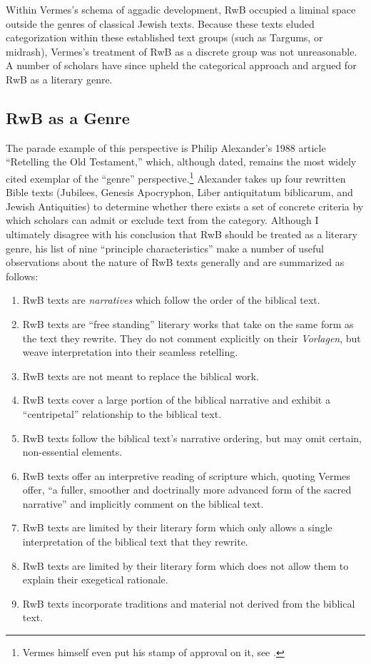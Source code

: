 Within Vermes's schema of aggadic development, RwB occupied a liminal
space outside the genres of classical Jewish texts. Because these texts
eluded categorization within these established text groups (such as
Targums, or midrash), Vermes's treatment of RwB as a discrete group was
not unreasonable. A number of scholars have since upheld the categorical
approach and argued for RwB as a literary genre.

\subsection{RwB as a Genre}\label{rwb-as-a-genre}

The parade example of this perspective is Philip Alexander's 1988
article ``Retelling the Old Testament,'' which, although dated, remains
the most widely cited exemplar of the ``genre'' perspective.\footnote{\textcite{alexander_carson-williamson1988}
  Vermes himself even put his stamp of approval on it, see
  \textcite[4]{vermes_zsengeller2014}.} Alexander takes up four
rewritten Bible texts (Jubilees, Genesis Apocryphon,
Liber antiquitatum biblicarum, and Jewish Antiquities) to determine
whether there exists a set of concrete criteria by which scholars can
admit or exclude text from the category. Although I ultimately disagree
with his conclusion that RwB should be treated as a literary genre, his
list of nine ``principle characteristics'' make a number of useful
observations about the nature of RwB texts generally and are summarized
as follows:

\begin{enumerate}
\def\labelenumi{\arabic{enumi}.}
\tightlist
\item
  RwB texts are \emph{narratives} which follow the order of the biblical
  text.
\item
  RwB texts are ``free standing'' literary works that take on the same
  form as the text they rewrite. They do not comment explicitly on their
  \emph{Vorlagen}, but weave interpretation into their seamless
  retelling.
\item
  RwB texts are not meant to replace the biblical work.
\item
  RwB texts cover a large portion of the biblical narrative and exhibit
  a ``centripetal'' relationship to the biblical text.
\item
  RwB texts follow the biblical text's narrative ordering, but may omit
  certain, non-essential elements.
\item
  RwB texts offer an interpretive reading of scripture which, quoting
  Vermes offer, ``a fuller, smoother and doctrinally more advanced form
  of the sacred narrative''\autocite[Citing Vermes in][305]{schurer1986}
  and implicitly comment on the biblical text.
\item
  RwB texts are limited by their literary form which only allows a
  single interpretation of the biblical text that they rewrite.
\item
  RwB texts are limited by their literary form which does not allow them
  to explain their exegetical rationale.
\item
  RwB texts incorporate traditions and material not derived from the
  biblical text.
\end{enumerate}

